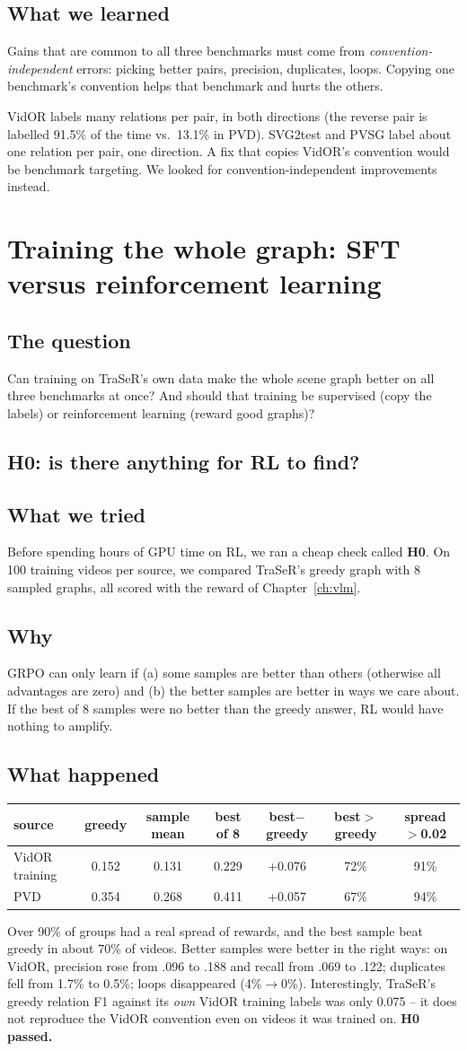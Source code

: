 \documentclass[11pt,openany]{book}
\newcommand{\qsec}{\section*{The question}}
\newcommand{\tsec}{\section*{What we tried}}
\newcommand{\wsec}{\section*{Why}}
\newcommand{\hsec}{\section*{What happened}}
\newcommand{\lsec}{\section*{What we learned}}
\begin{document}
\lsec
Gains that are common to all three benchmarks must come from \emph{convention-independent} errors: picking better pairs,
precision, duplicates, loops. Copying one benchmark's convention helps that benchmark and hurts the others.

\begin{summarybox}
VidOR labels many relations per pair, in both directions (the reverse pair is labelled 91.5\% of the time vs.\ 13.1\% in PVD).
SVG2test and PVSG label about one relation per pair, one direction. A fix that copies VidOR's convention would be benchmark
targeting. We looked for convention-independent improvements instead.
\end{summarybox}

\chapter[Whole-graph training: SFT versus RL]{Training the whole graph: SFT versus reinforcement learning}\label{ch:rl}

\qsec
Can training on TraSeR's own data make the whole scene graph better on all three benchmarks at once? And should that training be
supervised (copy the labels) or reinforcement learning (reward good graphs)?

\section{H0: is there anything for RL to find?}
\tsec
Before spending hours of GPU time on RL, we ran a cheap check called \textbf{H0}. On 100 training videos per source, we compared
TraSeR's greedy graph with 8 sampled graphs, all scored with the reward of Chapter~\ref{ch:vlm}.

\wsec
GRPO can only learn if (a) some samples are better than others (otherwise all advantages are zero) and (b) the better samples are
better in ways we care about. If the best of 8 samples were no better than the greedy answer, RL would have nothing to amplify.

\hsec
\begin{center}
\small
\begin{tabular}{@{}lcccccc@{}}
\toprule
source & greedy & sample mean & best of 8 & best$-$greedy & best$>$greedy & spread$>$0.02 \\
\midrule
VidOR training & 0.152 & 0.131 & 0.229 & +0.076 & 72\% & 91\% \\
PVD & 0.354 & 0.268 & 0.411 & +0.057 & 67\% & 94\% \\
\bottomrule
\end{tabular}
\end{center}
Over 90\% of groups had a real spread of rewards, and the best sample beat greedy in about 70\% of videos. Better samples were
better in the right ways: on VidOR, precision rose from .096 to .188 and recall from .069 to .122; duplicates fell from 1.7\% to
0.5\%; loops disappeared (4\%$\to$0\%). Interestingly, TraSeR's greedy relation F1 against its \emph{own} VidOR training labels was
only 0.075 -- it does not reproduce the VidOR convention even on videos it was trained on. \textbf{H0 passed.}
\end{document}
